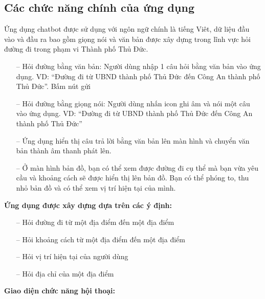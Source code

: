 \subsection{Các chức năng chính của ứng dụng}

Ứng dụng chatbot được sử dụng với ngôn ngữ chính là tiếng Viêt, dữ liệu đầu vào và đầu ra bao gồm giọng nói và văn bản được xây dựng trong lĩnh vực hỏi đường đi trong phạm vi Thành phố Thủ Đức.
\begin{itemize}
    \item[--] Hỏi đường bằng văn bản: Người dùng nhập 1 câu hỏi bằng văn bản vào ứng dụng. VD: “Đường đi từ UBND thành phố Thủ Đức đến Công An thành phố Thủ Đức”. Bấm nút gửi
    \item[--] Hỏi đường bằng giọng nói: Người dùng nhấn icon ghi âm và nói một câu vào ứng dụng. VD: “Đường đi từ UBND thành phố Thủ Đức đến Công An thành phố Thủ Đức”
    \item[--] Ứng dụng hiển thị câu trả lời bằng văn bản lên màn hình và chuyển văn bản thành âm thanh phát lên.
    \item[--] Ở màn hình bản đồ, bạn có thể xem được đường đi cụ thể mà bạn vừa yêu cầu và khoảng cách sẽ được hiển thị lên bản đồ. Bạn có thể phóng to, thu nhỏ bản đồ và có thể xem vị trí hiện tại của mình.
\end{itemize}
\textbf{Ứng dụng được xây dựng dựa trên các ý định:}
\begin{itemize}
    \item[--] Hỏi đường đi từ một địa điểm đến một địa điểm
    \item[--] Hỏi khoảng cách từ một địa điểm đến một địa điểm
    \item[--] Hỏi vị trí hiện tại của người dùng
    \item[--] Hỏi địa chỉ của một địa điểm  
\end{itemize}
\textbf{Giao diện chức năng hội thoại:}

